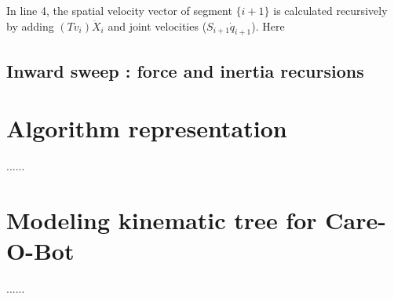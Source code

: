 In line 4, the spatial velocity vector of segment $\{i+1\}$ is calculated recursively by adding $(Tv_i)\ddot{X}_i$ and joint velocities ($S_{i+1}\dot{q}_{i+1}$). Here 


\subsection{Inward sweep : force and inertia recursions}

\section{Algorithm representation}{......}

\section{Modeling kinematic tree for Care-O-Bot}{......}

